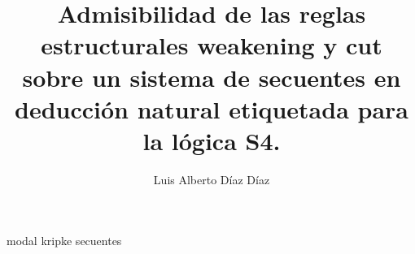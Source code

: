 \documentclass[12pt,twoside,a4paper]{report}
\begin{document}
\title{Admisibilidad de las reglas estructurales weakening y cut sobre un sistema de secuentes en deducción natural etiquetada para la lógica S4.}

\author{Luis Alberto Díaz Díaz}

\maketitle


{modal}
{kripke}
{secuentes}
\end{document}
